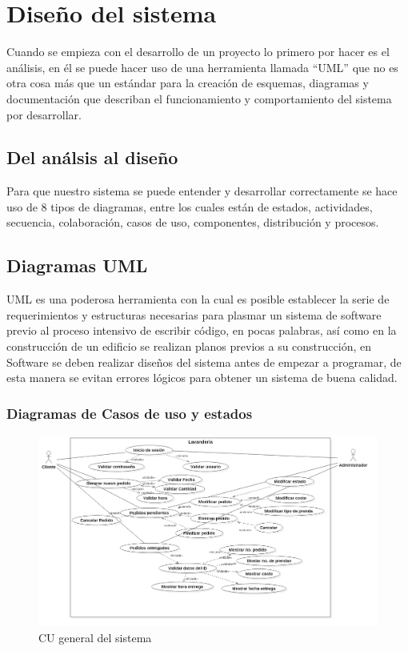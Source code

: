 \section{Diseño del sistema}
Cuando se empieza con el desarrollo de un proyecto lo primero por hacer es el análisis, en él se puede hacer uso de una herramienta llamada “UML” que no es otra cosa más que un estándar para la creación de esquemas, diagramas y documentación que describan el funcionamiento y comportamiento del sistema por desarrollar.
\subsection{Del análsis al diseño}
Para que nuestro sistema se puede entender y desarrollar correctamente se hace uso de 8 tipos de diagramas, entre los cuales están de estados, actividades, secuencia, colaboración, casos de uso, componentes, distribución y procesos.
\subsection{Diagramas UML}
UML es una poderosa herramienta con la cual es posible establecer la serie de requerimientos y estructuras necesarias para plasmar un sistema de software previo al proceso intensivo de escribir código, en pocas palabras, así como en la construcción de un edificio se realizan planos previos a su construcción, en Software se deben realizar diseños del sistema antes de empezar a programar, de esta manera se evitan errores lógicos para obtener un sistema de buena calidad.
\subsubsection{Diagramas de Casos de uso y estados}


\begin{figure}[htb]
\begin{center}
\includegraphics[width=18cm]{./imagenes/diagramas/CU_Lavanderia.png}
\end{center}
\caption{CU general del sistema}
\end{figure}


